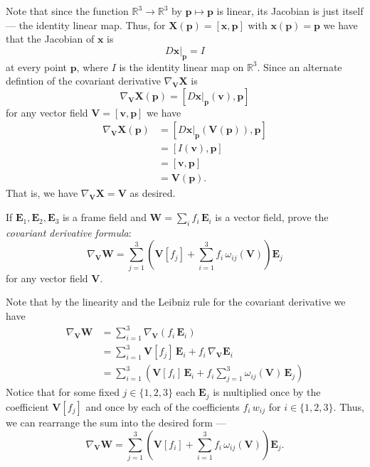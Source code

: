 \documentclass[12 pt, letterpaper]{hmcpset}
\begin{document}
\begin{solution}
	Note that since the function $\mathbb{R}^{3} \to \mathbb{R}^{3}$ by $\mathbf{p} \mapsto \mathbf{p}$ is linear, its Jacobian is just itself --- the identity linear map. Thus, for $\mathbf{X}(\mathbf{p}) = [\mathbf{x}, \mathbf{p}]$ with $\mathbf{x}(\mathbf{p}) = \mathbf{p}$ we have that the Jacobian of $\mathbf{x}$ is
	\[
		D \mathbf{x} \Big |_{\mathbf{p}} = I
	\]
	at every point $\mathbf{p}$, where $I$ is the identity linear map on $\mathbb{R}^{3}$.
	Since an alternate defintion of the covariant derivative $\nabla_{\mathbf{V}} \mathbf{X}$ is
	\[
		\nabla_{\mathbf{V}} \mathbf{X}(\mathbf{p}) = [D \mathbf{x} \Big |_{\mathbf{p}} (\mathbf{v}), \mathbf{p}]
	\]
	for any vector field $\mathbf{V} = [\mathbf{v}, \mathbf{p}]$ we have
	\[
		\begin{split}
			\nabla_{\mathbf{V}} \mathbf{X}(\mathbf{p}) & = [D \mathbf{x} \Big |_{\mathbf{p}} (\mathbf{V}(\mathbf{p})), \mathbf{p}] \\
								   & = [I(\mathbf{v}), \mathbf{p}] \\
								   & = [\mathbf{v}, \mathbf{p}] \\
								   & = \mathbf{V}(\mathbf{p}).
		\end{split}
	\]
	That is, we have $\nabla_{\mathbf{V}} \mathbf{X} = \mathbf{V}$ as desired.
\end{solution}

\pagebreak

\begin{problem}[Problem 3.]
	If $\mathbf{E}_{1}, \mathbf{E}_{2}, \mathbf{E}_{3}$ is a frame field and $\mathbf{W} = \sum_{i} f_{i} \, \mathbf{E}_{i}$ is a vector field, prove the \textit{covariant derivative formula}:
	\[
		\nabla_{\mathbf{V}} \mathbf{W} = \sum_{j = 1}^{3} \left ( \mathbf{V}[f_{j}] + \sum_{i = 1}^{3} f_{i} \, \omega_{ij}(\mathbf{V}) \right ) \mathbf{E}_{j}
	\]
	for any vector field $\mathbf{V}$.
\end{problem}

\begin{solution}
	Note that by the linearity and the Leibniz rule for the covariant derivative we have
	\[
		\begin{split}
			\nabla_{\mathbf{V}} \mathbf{W} & = \sum_{i = 1}^{3} \nabla_{\mathbf{V}} (f_{i} \, \mathbf{E}_{i}) \\
						       & = \sum_{i = 1}^{3} \mathbf{V}[f_{j}] \, \mathbf{E}_{i} + f_{i} \, \nabla_{\mathbf{V}}\mathbf{E}_{i} \\
						       & = \sum_{i = 1}^{3} \left ( \mathbf{V}[f_{i}] \, \mathbf{E}_{i} + f_{i} \sum_{j = 1}^{3} \omega_{ij}(\mathbf{V}) \, \mathbf{E}_{j} \right )
		\end{split}
	\]
	Notice that for some fixed $j \in \{ 1, 2, 3 \}$ each $\mathbf{E}_{j}$ is multiplied once by the coefficient $\mathbf{V}[f_{j}]$ and once by each of the coefficients $f_{i} \, w_{ij}$ for $i \in \{ 1, 2, 3 \}$. Thus, we can rearrange the sum into the desired form ---
	\[
		\nabla_{\mathbf{V}} \mathbf{W} = \sum_{j = 1}^{3} \left ( \mathbf{V}[f_{i}] + \sum_{i = 1}^{3} f_{i} \, \omega_{ij}(\mathbf{V}) \right ) \mathbf{E}_{j}.
	\]
\end{solution}
\end{document}
